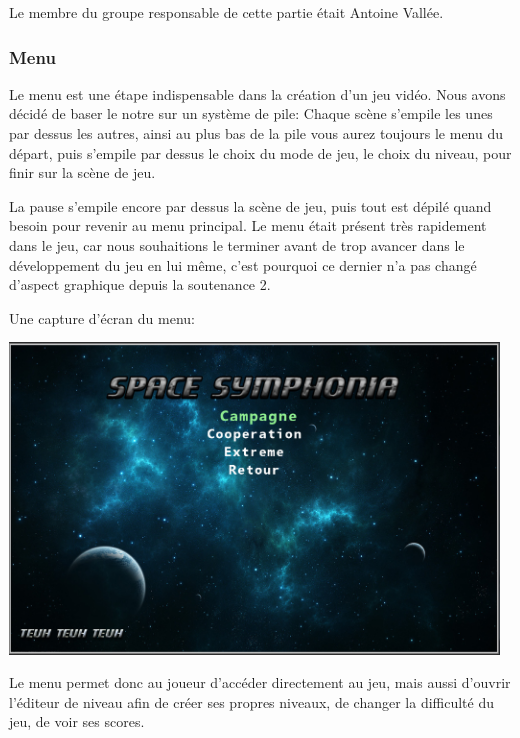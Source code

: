 \par Le membre du groupe responsable de cette partie était Antoine Vallée.

\subsubsection{Menu}
\par Le menu est une étape indispensable dans la création d'un jeu vidéo. Nous avons décidé de baser le notre sur un système de pile: Chaque scène s'empile les unes par dessus les autres, ainsi au plus bas de la pile vous aurez toujours le menu du départ, puis s'empile par dessus le choix du mode de jeu, le choix du niveau, pour finir sur la scène de jeu.
\par La pause s'empile encore par dessus la scène de jeu, puis tout est dépilé quand besoin pour revenir au menu principal. Le menu était présent très rapidement dans le jeu, car nous souhaitions le terminer avant de trop avancer dans le développement du jeu en lui même, c'est pourquoi ce dernier n'a pas changé d'aspect graphique depuis la soutenance 2.
\par Une capture d'écran du menu:

\begin{center}
	\includegraphics[width=13cm]{images/menu1.png}
\end{center}

\par Le menu permet donc au joueur d'accéder directement au jeu, mais aussi d'ouvrir l'éditeur de niveau afin de créer ses propres niveaux, de changer la difficulté du jeu, de voir ses scores.

